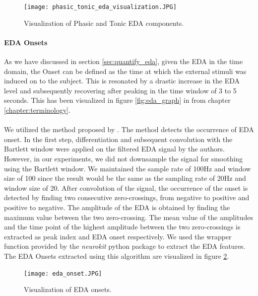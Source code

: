 \begin{figure}
    \centering
    \texttt{[image: phasic\_tonic\_eda\_visualization.JPG]}
    \caption{Visualization of Phasic and Tonic EDA components.}
    \label{fig:phasic_tonic_visualization}
\end{figure}


\paragraph{EDA Onsets} As we have discussed in section \ref{sec:quantify_eda}, given the EDA in the time domain, the Onset can be defined as the time at which the external stimuli was induced on to the subject. This is resonated by a drastic increase in the EDA level and subsequently recovering after peaking in the time window of 3 to 5 seconds. This has been visualized in figure \ref{fig:eda_graph} in from chapter \ref{chapter:terminology}.

\paragraph{} We utilized the method proposed by \citeauthor{kim_emotion_2004} \cite{kim_emotion_2004}. The method detects the occurrence of EDA onset. In the first step, differentiation and subsequent convolution with the Bartlett window were applied on the filtered EDA signal by the authors. However, in our experiments, we did not downsample the signal for smoothing using the Bartlett window. We maintained the sample rate of 100Hz and window size of 100 since the result would be the same as the sampling rate of 20Hz and window size of 20. After convolution of the signal, the occurrence of the onset is detected by finding two consecutive zero-crossings, from negative to positive and positive to negative. The amplitude of the EDA is obtained by finding the maximum value between the two zero-crossing. The mean value of the amplitudes and the time point of the highest amplitude between the two zero-crossings is extracted as peak index and EDA onset respectively. We used the wrapper function provided by the \textit{neurokit} python package to extract the EDA features. The EDA Onsets extracted using this algorithm are visualized in figure \ref{fig:eda_onsets}.

\begin{figure}
    \centering
    \texttt{[image: eda\_onset.JPG]}
    \caption{Visualization of EDA onsets.}
    \label{fig:eda_onsets}
\end{figure}

